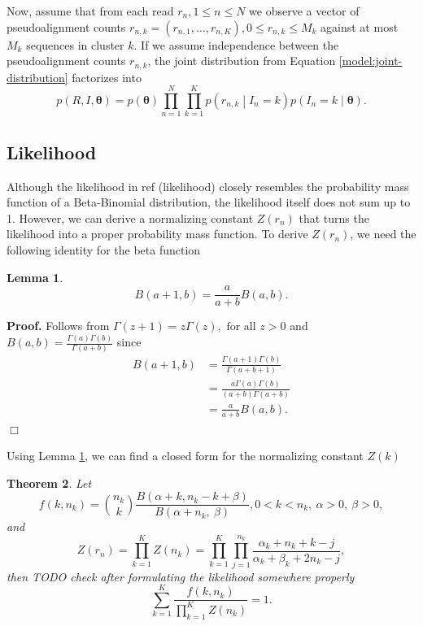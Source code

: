 \documentclass[officiallayout]{tktla}
\newtheorem{theorem}{Theorem}[section]
\newtheorem{lemma}[theorem]{Lemma}
\newtheorem{theorem}{Theorem}[chapter]
\newenvironment{proof}{\noindent\textbf{Proof.} }{$\Box$}
\begin{document}
Now, assume that from each read $r_{n}, 1 \leq n \leq N$ we observe a
vector of pseudoalignment counts $r_{n, k} = \left(r_{n, 1}, \dots,
r_{n, K}\right), 0 \leq r_{n, k} \leq M_{k} $ against at most $M_{k}$
sequences in cluster $k$. If we assume independence between the
pseudoalignment counts $r_{n, k}$, the joint distribution from
Equation \ref{model:joint-distribution} factorizes into
\begin{equation}
  \label{model:joint-distribution}
  p\left(R, I, \boldsymbol\theta\right) = p\left(\boldsymbol\theta\right)\prod_{n = 1}^{N} \prod_{k = 1}^{K} p\left(r_{n, k} \middle| I_{n} = k\right) p\left(I_{n} = k \middle| \boldsymbol\theta\right).
\end{equation}

\subsection{Likelihood}

Although the likelihood in ref (likelihood) closely resembles the
probability mass function of a Beta-Binomial distribution, the
likelihood itself does not sum up to 1. However, we can derive a
normalizing constant $Z\left(r_{n}\right)$ that turns the likelihood
into a proper probability mass function. To derive
$Z\left(r_{n}\right)$, we need the following identity for the beta
function
\begin{lemma}
  \label{lemma:beta-function-identity}
  \[
  B\left(a + 1, b\right) = \frac{a}{a + b}B\left(a, b\right).
  \]
\end{lemma}

\begin{proof}
  Follows from $\Gamma\left(z + 1\right) = z\Gamma\left(z\right), \text{ for all } z > 0$ \citep{davis_leonhard} and $B\left(a, b\right) = \frac{\Gamma\left(a\right)\Gamma\left(b\right)}{\Gamma\left(a + b\right)}$ \citep{artin_einfuhrung} since
  \begin{align*}
    B\left(a + 1, b\right) &= \frac{\Gamma\left(a + 1\right)\Gamma\left(b\right)}{\Gamma\left(a + b + 1\right)} \\
    &= \frac{a\Gamma\left(a\right)\Gamma\left(b\right)}{\left(a + b\right)\Gamma\left(a + b\right)} \\
    &= \frac{a}{a + b}B\left(a, b\right).
  \end{align*}
\end{proof}

Using Lemma \ref{lemma:beta-function-identity}, we can find a closed form for the normalizing constant $Z\left(k\right)$
\begin{theorem}
  \label{theorem:likelihood-can-be-normalized}
  Let
  \[
  f\left(k, n_{k}\right) = \binom{n_{k}}{k}\frac{B\left(\alpha + k, n_{k} - k + \beta\right)}{B\left(\alpha + n_{k}, \: \beta\right)}, 0 < k < n_{k}, \: \alpha > 0, \: \beta > 0,
  \]
  and
  \[
  Z\left(r_{n}\right) = \prod_{k = 1}^{K}Z\left(n_{k}\right) = \prod_{k = 1}^{K}\prod_{j = 1}^{n_{k}}\frac{\alpha_{k} + n_{k} + k - j}{\alpha_{k} + \beta_{k} + 2n_{k} - j},
  \]
  then TODO check after formulating the likelihood somewhere properly
  \[
  \sum_{k = 1}^{K} \frac{f\left(k, n_{k}\right)}{\prod_{k = 1}^{K}Z\left(n_{k}\right)} = 1.
  \]
\end{theorem}
\end{document}
